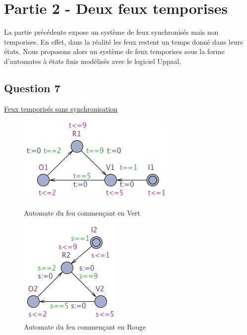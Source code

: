 \documentclass[pdftex,12pt,a4paper]{article}
\begin{document}
\newpage
\section{Partie 2 - Deux feux temporises}
La partie précédente expose un système de feux synchronisés mais non temporises. En effet, dans la réalité les feux restent un temps donné dans leurs états. Nous proposons alors un système de feux temporises sous la forme d'automates à états finis modélisés avec le logiciel Uppaal.

\subsection{Question 7}

\href{https://github.com/masters-info-nantes/hong-cheng-lv/blob/master/ressources/part2/Q7-FeuxTemporises.xml}{Feux temporisés sans synchronisation}

\begin{figure}[H]
    \begin{minipage}[c]{.46\linewidth}
		\centering
		\includegraphics[scale=0.5]{ressources/part2/Q7-1.png}
		\caption{Automate du feu commençant en Vert}
    \end{minipage}
    \hfill%
    \begin{minipage}[c]{.46\linewidth}
		\centering
		\includegraphics[scale=0.5]{ressources/part2/Q7-2.png}
		\caption{Automate du feu commençant en Rouge}
    \end{minipage}
\end{figure}
\end{document}
